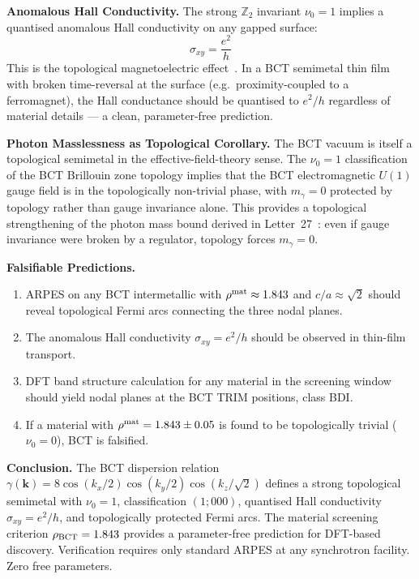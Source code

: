 \documentclass[aps,prl,twocolumn,superscriptaddress,floatfix]{revtex4-2}
\begin{document}
\medskip
\noindent\textbf{Anomalous Hall Conductivity.}
The strong $\mathbb{Z}_2$ invariant $\nu_0 = 1$ implies a quantised
anomalous Hall conductivity on any gapped surface:
\begin{equation}
  \sigma_{xy} = \frac{e^2}{h}
  \label{eq:AHE}
\end{equation}
This is the topological magnetoelectric effect~\cite{Qi2008}.
In a BCT semimetal thin film with broken time-reversal at the surface
(e.g.\ proximity-coupled to a ferromagnet), the Hall conductance
should be quantised to $e^2/h$ regardless of material details —
a clean, parameter-free prediction.

\medskip
\noindent\textbf{Photon Masslessness as Topological Corollary.}
The BCT vacuum is itself a topological semimetal in the effective-field-theory
sense. The $\nu_0 = 1$ classification of the BCT Brillouin zone topology
implies that the BCT electromagnetic $U(1)$ gauge field is in the topologically
non-trivial phase, with $m_\gamma = 0$ protected by topology rather than
gauge invariance alone. This provides a topological strengthening of the
photon mass bound derived in Letter~27~\cite{L27}: even if gauge invariance
were broken by a regulator, topology forces $m_\gamma = 0$.

\medskip
\noindent\textbf{Falsifiable Predictions.}
\begin{enumerate}
\item ARPES on any BCT intermetallic with $\rho^{\rm mat} \approx 1.843$
  and $c/a \approx \sqrt{2}$ should reveal topological Fermi arcs connecting
  the three nodal planes.
\item The anomalous Hall conductivity $\sigma_{xy} = e^2/h$ should be
  observed in thin-film transport.
\item DFT band structure calculation for any material in the screening window
  should yield nodal planes at the BCT TRIM positions, class BDI.
\item If a material with $\rho^{\rm mat} = 1.843 \pm 0.05$ is found to be
  topologically trivial ($\nu_0 = 0$), BCT is falsified.
\end{enumerate}

\medskip
\noindent\textbf{Conclusion.}
The BCT dispersion relation $\gamma(\mathbf{k}) = 8\cos(k_x/2)\cos(k_y/2)\cos(k_z/\sqrt{2})$
defines a strong topological semimetal with $\nu_0 = 1$, classification $(1;000)$,
quantised Hall conductivity $\sigma_{xy} = e^2/h$, and topologically protected
Fermi arcs. The material screening criterion $\rho_{\rm BCT} = 1.843$ provides
a parameter-free prediction for DFT-based discovery. Verification requires
only standard ARPES at any synchrotron facility. Zero free parameters.
\end{document}

